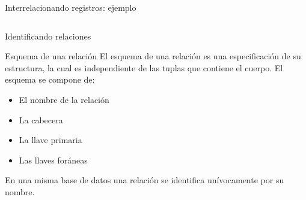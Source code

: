 \begin{frame}{Interrelacionando registros: ejemplo}
\begin{columns}[T]
        \begin{column}{0.48\linewidth}
        \end{column}
    \end{columns}
\end{frame}

\begin{frame}{Identificando relaciones}
    \begin{block}{Esquema de una relaci\'on}
        El esquema de una relaci\'on es una especificaci\'on de su estructura, la cual
        es independiente de las tuplas
        que contiene el cuerpo. El esquema se compone de: \begin{itemize}
            \item El nombre de la relaci\'on
            \item La cabecera
            \item La llave primaria
            \item Las llaves for\'aneas
        \end{itemize}
        En una misma base de datos una relaci\'on se identifica un\'ivocamente por su nombre.
    \end{block}

\end{frame}


